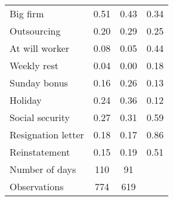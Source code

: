 \begin{tabular}{lccc}
Big firm & 0.51  & 0.43  & \multicolumn{1}{r}{0.34} \\
Outsourcing  & 0.20  & 0.29  & \multicolumn{1}{r}{0.25} \\
At will worker & 0.08  & 0.05  & \multicolumn{1}{r}{0.44} \\
Weekly rest & 0.04  & 0.00  & \multicolumn{1}{r}{0.18} \\
Sunday bonus & 0.16  & 0.26  & \multicolumn{1}{r}{0.13} \\
Holiday & 0.24  & 0.36  & \multicolumn{1}{r}{0.12} \\
Social security & 0.27  & 0.31  & \multicolumn{1}{r}{0.59} \\
Resignation letter & 0.18  & 0.17  & \multicolumn{1}{r}{0.86} \\
Reinstatement & 0.15  & 0.19  & \multicolumn{1}{r}{0.51} \\
Number of days & 110   & 91    &  \\
\midrule
Observations & 774   & 619   &  \\
\bottomrule
\bottomrule
\end{tabular}%
